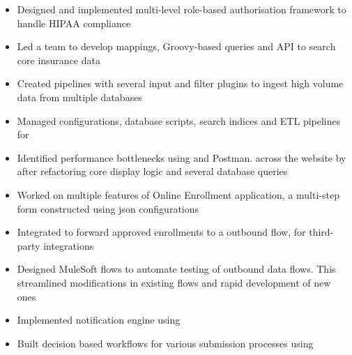 \documentclass[]{resume}
\begin{document}
\begin{minipage}[t]{0.66\textwidth}
\begin{itemize}
    \item Designed and implemented multi-level role-based authorisation framework to handle HIPAA compliance
    \item Led a team to develop  mappings, Groovy-based queries and  API to search core insurance data
    \item Created  pipelines with several input and filter plugins to ingest high volume data from multiple databases
    \item Managed configurations, database scripts, search indices and ETL pipelines for  
    \item Identified performance bottlenecks using  and Postman.  across the website by  after refactoring core display logic and several database queries
    \item Worked on multiple features of Online Enrollment application, a multi-step form constructed using json configurations 
    \item Integrated  to forward approved enrollments to a  outbound flow, for third-party integrations
    \item Designed MuleSoft flows to automate testing of outbound data flows. This streamlined modifications in existing flows and rapid development of new ones
    \item Implemented notification engine using 
    \item Built decision based workflows for various submission processes using 
\end{itemize}
\sectionsep

\end{minipage} 
\end{document}
